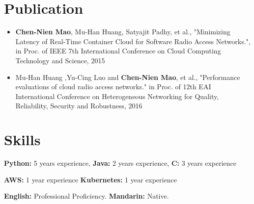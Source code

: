 \documentclass{article}
\begin{document}
\section{Publication}
\begin{itemize}
\item  \textbf{Chen-Nien Mao}, Mu-Han Huang, Satyajit Padhy, et al., "Minimizing Latency of Real-Time Container Cloud for Software Radio Access Networks.", in Proc. of IEEE 7th International Conference on Cloud Computing Technology and Science,
2015  
\item Mu-Han Huang ,Yu-Cing Luo and \textbf{Chen-Nien Mao}, et al., "Performance evaluations of cloud radio access networks." in Proc. of 12th EAI International Conference on Heterogeneous Networking for Quality, Reliability, Security and Robustness, 2016
\end{itemize}

\section{Skills}
\begin{description}[widest=Langauges]
\item[Programming Skills:]
\textbf{Python:} 5 years experience,
\textbf{Java:} 2 years experience,
\textbf{C:} 3 years experience
\item[Technical Skills:]
\textbf{AWS:} 1 year experience
\textbf{Kubernetes:} 1 year experience
\item[Languages:] 
\textbf{English:} Professional Proficiency.
\textbf{Mandarin:} Native.
\end{description}
\end{document}
